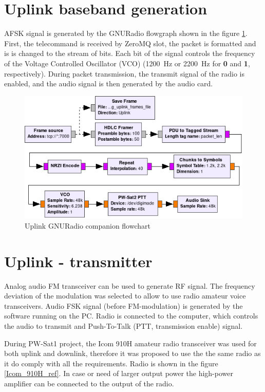 \section{Uplink baseband generation}
AFSK signal is generated by the GNURadio flowgraph shown in the figure \ref{uplink_flowgraph}. First, the telecommand is received by ZeroMQ slot, the packet is formatted and is is changed to the stream of bits. Each bit of the signal controls the frequency of the Voltage Controlled Oscillator (VCO) (\SI{1200}{\hertz} or \SI{2200}{\hertz} for \textbf{0} and \textbf{1}, respectively). During packet transmission, the transmit signal of the radio is enabled, and the audio signal is then generated by the audio card.

\begin{figure}
    \centering
    \includegraphics[width=0.8\paperwidth]{img/5/uplink_flowgraph.png}
    \caption{Uplink GNURadio companion flowchart}
    \label{uplink_flowgraph}
\end{figure}


\section{Uplink - transmitter}
Analog audio FM transceiver can be used to generate RF signal. The frequency deviation of the modulation was selected to allow to use radio amateur voice transceivers. Audio FSK signal (before FM-modulation) is generated by the software running on the PC. Radio is connected to the computer, which controls the audio to transmit and Push-To-Talk (PTT, transmission enable) signal.

During PW-Sat1 project, the Icom 910H amateur radio transceiver was used for both uplink and downlink, therefore it was proposed to use the the same radio as it do comply with all the requirements. Radio is shown in the figure \ref{Icom_910H_ref}. In case or need of larger output power the high-power amplifier can be connected to the output of the radio.

